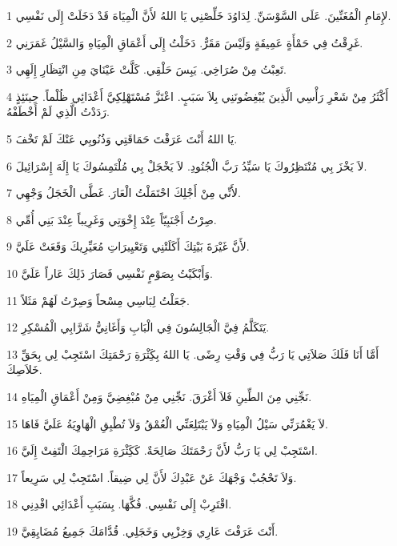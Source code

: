 \par 1 لإِمَامِ الْمُغَنِّينَ. عَلَى السَّوْسَنِّ. لِدَاوُدَ خَلِّصْنِي يَا اللهُ لأَنَّ الْمِيَاهَ قَدْ دَخَلَتْ إِلَى نَفْسِي.
\par 2 غَرِقْتُ فِي حَمْأَةٍ عَمِيقَةٍ وَلَيْسَ مَقَرٌّ. دَخَلْتُ إِلَى أَعْمَاقِ الْمِيَاهِ وَالسَّيْلُ غَمَرَنِي.
\par 3 تَعِبْتُ مِنْ صُرَاخِي. يَبِسَ حَلْقِي. كَلَّتْ عَيْنَايَ مِنِ انْتِظَارِ إِلَهِي.
\par 4 أَكْثَرُ مِنْ شَعْرِ رَأْسِي الَّذِينَ يُبْغِضُونَنِي بِلاَ سَبَبٍ. اعْتَزَّ مُسْتَهْلِكِيَّ أَعْدَائِي ظُلْماً. حِينَئِذٍ رَدَدْتُ الَّذِي لَمْ أَخْطَفْهُ.
\par 5 يَا اللهُ أَنْتَ عَرَفْتَ حَمَاقَتِي وَذُنُوبِي عَنْكَ لَمْ تَخْفَ.
\par 6 لاَ يَخْزَ بِي مُنْتَظِرُوكَ يَا سَيِّدُ رَبَّ الْجُنُودِ. لاَ يَخْجَلْ بِي مُلْتَمِسُوكَ يَا إِلَهَ إِسْرَائِيلَ.
\par 7 لأَنِّي مِنْ أَجْلِكَ احْتَمَلْتُ الْعَارَ. غَطَّى الْخَجَلُ وَجْهِي.
\par 8 صِرْتُ أَجْنَبِيّاً عِنْدَ إِخْوَتِي وَغَرِيباً عِنْدَ بَنِي أُمِّي.
\par 9 لأَنَّ غَيْرَةَ بَيْتِكَ أَكَلَتْنِي وَتَعْيِيرَاتِ مُعَيِّرِيكَ وَقَعَتْ عَلَيَّ.
\par 10 وَأَبْكَيْتُ بِصَوْمٍ نَفْسِي فَصَارَ ذَلِكَ عَاراً عَلَيَّ.
\par 11 جَعَلْتُ لِبَاسِي مِسْحاً وَصِرْتُ لَهُمْ مَثَلاً.
\par 12 يَتَكَلَّمُ فِيَّ الْجَالِسُونَ فِي الْبَابِ وَأَغَانِيُّ شَرَّابِي الْمُسْكِرِ.
\par 13 أَمَّا أَنَا فَلَكَ صَلاَتِي يَا رَبُّ فِي وَقْتِ رِضًى. يَا اللهُ بِكَِثْرَةِ رَحْمَتِكَ اسْتَجِبْ لِي بِحَقِّ خَلاَصِكَ.
\par 14 نَجِّنِي مِنَ الطِّينِ فَلاَ أَغْرَقَ. نَجِّنِي مِنْ مُبْغِضِيَّ وَمِنْ أَعْمَاقِ الْمِيَاهِ.
\par 15 لاَ يَغْمُرَنِّي سَيْلُ الْمِيَاهِ وَلاَ يَبْتَلِعَنِّي الْعُمْقُ وَلاَ تُطْبِقِ الْهَاوِيَةُ عَلَيَّ فَاهَا.
\par 16 اسْتَجِبْ لِي يَا رَبُّ لأَنَّ رَحْمَتَكَ صَالِحَةٌ. كَكَِثْرَةِ مَرَاحِمِكَ الْتَفِتْ إِلَيَّ.
\par 17 وَلاَ تَحْجُبْ وَجْهَكَ عَنْ عَبْدِكَ لأَنَّ لِي ضِيقاً. اسْتَجِبْ لِي سَرِيعاً.
\par 18 اقْتَرِبْ إِلَى نَفْسِي. فُكَّهَا. بِسَبَبِ أَعْدَائِي افْدِنِي.
\par 19 أَنْتَ عَرَفْتَ عَارِي وَخِزْيِي وَخَجَلِي. قُدَّامَكَ جَمِيعُ مُضَايِقِيَّ.
